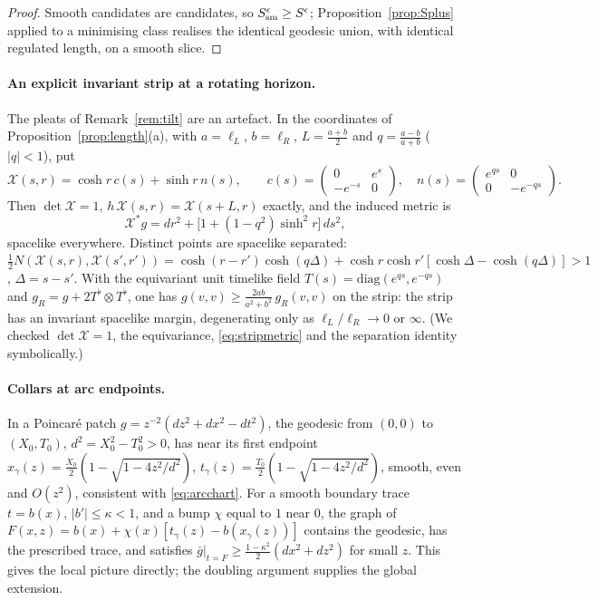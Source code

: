 \documentclass[aps,prd,onecolumn,superscriptaddress,nofootinbib,amsmath,amssymb,11pt]{revtex4-2}
\theoremstyle{definition}
\newcommand{\eps}{\epsilon}
\begin{document}
\begin{proof}
Smooth candidates are candidates, so $S^\eps_{\rm sm}\ge S^\eps$; Proposition~\ref{prop:Splus} applied to a minimising class realises
the identical geodesic union, with identical regulated length, on a smooth slice.
\end{proof}

\paragraph*{An explicit invariant strip at a rotating horizon.} The pleats of Remark~\ref{rem:tilt} are an artefact. In the
coordinates of Proposition~\ref{prop:length}(a), with $a=\ell_L$, $b=\ell_R$, $L=\frac{a+b}2$ and $q=\frac{a-b}{a+b}$ ($|q|<1$), put
\begin{equation}\label{eq:strip}
\mathcal X(s,r)=\cosh r\,c(s)+\sinh r\,n(s),\qquad
c(s)=\begin{pmatrix}0&e^s\\-e^{-s}&0\end{pmatrix},\quad n(s)=\begin{pmatrix}e^{qs}&0\\0&-e^{-qs}\end{pmatrix}.
\end{equation}
Then $\det\mathcal X=1$, $h\,\mathcal X(s,r)=\mathcal X(s+L,r)$ exactly, and the induced metric is
\begin{equation}\label{eq:stripmetric}
\mathcal X^*g=dr^2+\big[1+(1-q^2)\sinh^2r\big]\,ds^2,
\end{equation}
spacelike everywhere. Distinct points are spacelike separated:
$\frac12N(\mathcal X(s,r),\mathcal X(s',r'))=\cosh(r-r')\cosh(q\Delta)+\cosh r\cosh r'[\cosh\Delta-\cosh(q\Delta)]>1$, $\Delta=s-s'$. With the
equivariant unit timelike field $T(s)=\mathrm{diag}(e^{qs},e^{-qs})$ and $g_R=g+2T^\flat\otimes T^\flat$, one has
$g(v,v)\ge\frac{2ab}{a^2+b^2}\,g_R(v,v)$ on the strip: the strip has an invariant spacelike margin, degenerating only as
$\ell_L/\ell_R\to0$ or $\infty$. (We checked $\det\mathcal X=1$, the equivariance, \eqref{eq:stripmetric} and the separation identity
symbolically.)

\paragraph*{Collars at arc endpoints.} In a Poincar\'e patch $g=z^{-2}(dz^2+dx^2-dt^2)$, the geodesic from $(0,0)$ to $(X_0,T_0)$,
$d^2=X_0^2-T_0^2>0$, has near its first endpoint $x_\gamma(z)=\frac{X_0}2(1-\sqrt{1-4z^2/d^2})$,
$t_\gamma(z)=\frac{T_0}2(1-\sqrt{1-4z^2/d^2})$, smooth, even and $O(z^2)$, consistent with \eqref{eq:arcchart}. For a smooth boundary
trace $t=b(x)$, $|b'|\le\kappa<1$, and a bump $\chi$ equal to $1$ near $0$, the graph of
$F(x,z)=b(x)+\chi(x)[t_\gamma(z)-b(x_\gamma(z))]$ contains the geodesic, has the prescribed trace, and satisfies
$\bar g|_{t=F}\ge\frac{1-\kappa^2}{2}(dx^2+dz^2)$ for small $z$. This gives the local picture directly; the doubling argument supplies
the global extension.
\end{document}
